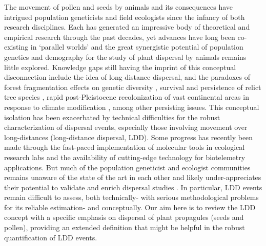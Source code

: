 \documentclass[a4paper, 12pt]{article}
\begin{document}
\begin{linenumbers}
The movement of pollen and seeds by animals and its consequences have intrigued population geneticists and field ecologists since the infancy of both research disciplines. Each has generated an impressive body of theoretical and empirical research through the past decades, yet advances have long been co-existing in ‘parallel worlds’ and the great synergistic potential of population genetics and demography for the study of plant dispersal by animals remains little explored. Knowledge gaps still having the imprint of this conceptual disconnection include the idea of long distance dispersal, and the paradoxes of forest fragmentation effects on genetic diversity \citep{Kramer:2008kg}, survival and persistence of relict tree species \citep{Hampe:2011bv}, rapid post-Pleistocene recolonization of vast continental areas in response to climate modification \citep{Clark:1998aa,Clark:1998vi}, among other persisting issues. This conceptual isolation has been exacerbated by technical difficulties for the robust characterization of dispersal events, especially those involving movement over long-distances (long-distance dispersal, LDD). Some progress has recently been made through the fast-paced implementation of molecular tools in ecological research labs and the availability of cutting-edge technology for biotelemetry applications. But much of the population geneticist and ecologist communities remains unaware of the state of the art in each other and likely under-appreciates their potential to validate and enrich dispersal studies \citep{Jones:2008il}. In particular, LDD events remain difficult to assess, both technically- with serious methodological problems for its reliable estimation- and conceptually. Our aim here is to review the LDD concept with a specific emphasis on dispersal of plant propagules (seeds and pollen), providing an extended definition that might be helpful in the robust quantification of LDD events.   


\end{linenumbers}
\end{document}
